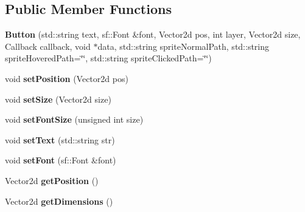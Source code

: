 \subsection*{Public Member Functions}
\begin{DoxyCompactItemize}
\item 
{\bfseries Button} (std\+::string text, sf\+::\+Font \&font, Vector2d pos, int layer, Vector2d size, Callback callback, void $\ast$data, std\+::string sprite\+Normal\+Path, std\+::string sprite\+Hovered\+Path=\char`\"{}\char`\"{}, std\+::string sprite\+Clicked\+Path=\char`\"{}\char`\"{})\hypertarget{class_otter_engine_1_1_button_af72b406844217a523be24214b1164825}{}\label{class_otter_engine_1_1_button_af72b406844217a523be24214b1164825}

\item 
void {\bfseries set\+Position} (Vector2d pos)\hypertarget{class_otter_engine_1_1_button_a6a0d67dfbae91fdbaae4e9ce8bb9cde3}{}\label{class_otter_engine_1_1_button_a6a0d67dfbae91fdbaae4e9ce8bb9cde3}

\item 
void {\bfseries set\+Size} (Vector2d size)\hypertarget{class_otter_engine_1_1_button_ac06271abf7c148821dc57642764b334f}{}\label{class_otter_engine_1_1_button_ac06271abf7c148821dc57642764b334f}

\item 
void {\bfseries set\+Font\+Size} (unsigned int size)\hypertarget{class_otter_engine_1_1_button_a773fe6dfc149f96b6464cb5667d11312}{}\label{class_otter_engine_1_1_button_a773fe6dfc149f96b6464cb5667d11312}

\item 
void {\bfseries set\+Text} (std\+::string str)\hypertarget{class_otter_engine_1_1_button_a1f7fdb8db89cfc8d54a4443f7274bb56}{}\label{class_otter_engine_1_1_button_a1f7fdb8db89cfc8d54a4443f7274bb56}

\item 
void {\bfseries set\+Font} (sf\+::\+Font \&font)\hypertarget{class_otter_engine_1_1_button_a23cb567fa08dc64366e1fd95a2e05081}{}\label{class_otter_engine_1_1_button_a23cb567fa08dc64366e1fd95a2e05081}

\item 
Vector2d {\bfseries get\+Position} ()\hypertarget{class_otter_engine_1_1_button_a5cb8fb39ed0894951ff42f5adeb70719}{}\label{class_otter_engine_1_1_button_a5cb8fb39ed0894951ff42f5adeb70719}

\item 
Vector2d {\bfseries get\+Dimensions} ()\hypertarget{class_otter_engine_1_1_button_a3a65d82b95a0c05c834c3782f240d6a5}{}\label{class_otter_engine_1_1_button_a3a65d82b95a0c05c834c3782f240d6a5}


\end{DoxyCompactItemize}
